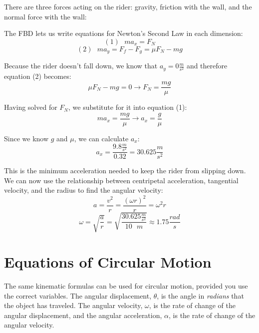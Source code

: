 \begin{Answer}[ref = gravitron]
There are three forces acting on the rider: gravity, friction with the wall, and the normal force with the wall:

\begin{center}
\end{center}

The FBD lets us write equations for Newton's Second Law in each dimension:
$$\left( 1 \right) \text{ }ma_x = F_N$$
$$\left( 2 \right) \text{ }ma_y = F_f - F_g = \mu F_N - mg$$

Because the rider doesn't fall down, we know that $a_y = 0 \frac{m}{s^2}$ and therefore equation (2) becomes:
$$\mu F_N - mg = 0 \to F_N = \frac{mg}{\mu}$$

Having solved for $F_N$, we substitute for it into equation (1):
$$ma_x = \frac{mg}{\mu} \to a_x = \frac{g}{\mu}$$

Since we know $g$ and $\mu$, we can calculate $a_x$:
$$a_x = \frac{9.8 \frac{m}{s^2}}{0.32} = 30.625 \frac{m}{s^2}$$

This is the minimum acceleration needed to keep the rider from slipping down. We can now use the relationship between centripetal acceleration, tangential velocity, and the radius to find the angular velocity:
$$a = \frac{v^2}{r} = \frac{\left( \omega r \right)^2}{r} = \omega^2 r$$
$$\omega = \sqrt{\frac{a}{r}} = \sqrt{\frac{30.625 \frac{m}{s^2}}{10 \text{ } m}} \approx 1.75 \frac{rad}{s}$$
\end{Answer}

\section{Equations of Circular Motion}

The same kinematic formulas can be used for circular motion, provided you use the correct variables. The angular displacement, $\theta$, is the angle in \emph{radians} that the object has traveled. The angular velocity, $\omega$, is the rate of change of the angular displacement, and the angular acceleration, $\alpha$, is the rate of change of the angular velocity.

